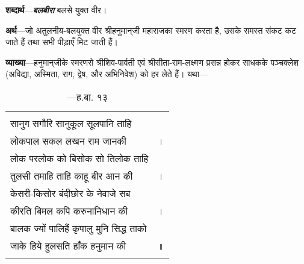 \parasepone
{}
\begin{sloppypar}\justifying{}
\textbf{शब्दार्थ}—\textbf{\textit{बलबीरा}} {} बलसे युक्त वीर।
\end{sloppypar}
\begin{sloppypar}\justifying{}
\textbf{अर्थ}—जो अतुलनीय-बलयुक्त वीर श्रीहनुमान्‌जी महाराजका स्मरण करता है, उसके समस्त संकट कट जाते हैं तथा सभी पीड़ाएँ मिट जाती हैं।
\end{sloppypar}
\parasepone
\begin{sloppypar}\justifying{}
\textbf{व्याख्या}—हनुमान्‌जीके स्मरणसे श्रीशिव-पार्वती एवं श्रीसीता-राम-लक्ष्मण प्रसन्न होकर साधकके पञ्चक्लेश (अविद्या, अस्मिता, राग, द्वेष, और अभिनिवेश) को हर लेते हैं। यथा—
\end{sloppypar}
{\bfseries
\setlength{\mylenone}{0pt}
\settowidth{\mylentwo}{सानुग सगौरि सानुकूल सूलपानि ताहि}
\setlength{\mylenone}{\maxof{\mylenone}{\mylentwo}}
\settowidth{\mylentwo}{लोकपाल सकल लखन राम जानकी}
\setlength{\mylenone}{\maxof{\mylenone}{\mylentwo}}
\settowidth{\mylentwo}{लोक परलोक को बिसोक सो तिलोक ताहि}
\setlength{\mylenone}{\maxof{\mylenone}{\mylentwo}}
\settowidth{\mylentwo}{तुलसी तमाहि ताहि काहू बीर आन की}
\setlength{\mylenone}{\maxof{\mylenone}{\mylentwo}}
\settowidth{\mylentwo}{केसरी-किसोर बंदीछोर के नेवाजे सब}
\setlength{\mylenone}{\maxof{\mylenone}{\mylentwo}}
\settowidth{\mylentwo}{कीरति बिमल कपि करुनानिधान की}
\setlength{\mylenone}{\maxof{\mylenone}{\mylentwo}}
\settowidth{\mylentwo}{बालक ज्यों पालिहैं कृपालु मुनि सिद्ध ताको}
\setlength{\mylenone}{\maxof{\mylenone}{\mylentwo}}
\settowidth{\mylentwo}{जाके हिये हुलसति हाँक हनुमान की}
\setlength{\mylenone}{\maxof{\mylenone}{\mylentwo}}
\setlength{\mylentwo}{\baselineskip}
\setlength{\mylenone}{\mylenone + 1pt}
\begin{longtable}[l]{@{\hspace*{\mylen}}>{\setlength\parfillskip{0pt}}p{\mylenone}@{}@{}l@{}}
 & \\[-\the\mylentwo]
सानुग सगौरि सानुकूल सूलपानि ताहि & \\ \nopagebreak
लोकपाल सकल लखन राम जानकी & ।\\
लोक परलोक को बिसोक सो तिलोक ताहि & \\ \nopagebreak
तुलसी तमाहि ताहि काहू बीर आन की & ।\\
केसरी-किसोर बंदीछोर के नेवाजे सब & \\ \nopagebreak
कीरति बिमल कपि करुनानिधान की & ।\\
बालक ज्यों पालिहैं कृपालु मुनि सिद्ध ताको & \\ \nopagebreak
जाके हिये हुलसति हाँक हनुमान की & ॥\\ \nopagebreak
\caption*{—ह.बा. १३}
\end{longtable}
}
\paraseplotus
\pagebreak


